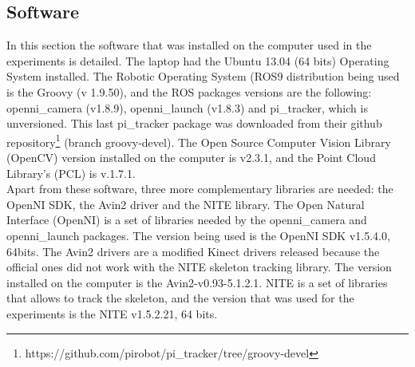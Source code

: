 	\subsection{Software}
		In this section the software that was installed on the computer used in the experiments is detailed. 
		The laptop had the Ubuntu 13.04 (64 bits) Operating System installed. 
		The Robotic Operating System (ROS9 distribution being used is the Groovy (v 1.9.50), and the ROS packages versions are the following: openni\_camera (v1.8.9), openni\_launch (v1.8.3) and pi\_tracker, which is unversioned.  
		This last pi\_tracker package  was downloaded from their github repository\footnote{https://github.com/pirobot/pi_tracker/tree/groovy-devel} (branch groovy-devel). 
		The Open Source Computer Vision Library (OpenCV) version installed on the computer is v2.3.1, and the Point Cloud Library's (PCL) is v.1.7.1. 
		\\

		Apart from these software, three more complementary libraries are needed: the OpenNI SDK, the Avin2 driver and the NITE library. 
		The Open Natural Interface (OpenNI) is a set of libraries needed by the openni\_camera and openni\_launch packages. 
		The version being used is the OpenNI SDK v1.5.4.0, 64bits. 
		The Avin2 drivers are a modified Kinect drivers released because the official ones did not work with the NITE skeleton tracking library. 
		The version installed on the computer is the Avin2-v0.93-5.1.2.1. 
		NITE is a set of libraries that allows to track the skeleton, and the version that was used for the experiments is the NITE v1.5.2.21, 64 bits. 




